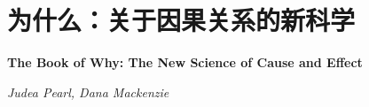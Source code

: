 \chapter{为什么：关于因果关系的新科学}
\Large\textbf{The Book of Why: The New Science of Cause and Effect}
\par \emph{Judea Pearl, Dana Mackenzie} \normalsize